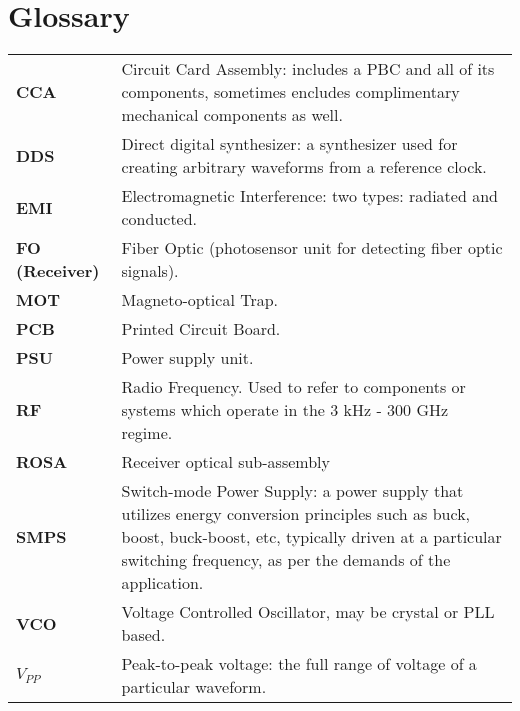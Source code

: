 \newpage
\section*{Glossary}

\begin{tabularx}{\linewidth}{lX}
  {\bf CCA} & Circuit Card Assembly: includes a PBC and all of its components,
  sometimes encludes complimentary mechanical components as well. \\
  {\bf DDS} & Direct digital synthesizer: a synthesizer used for creating
  arbitrary waveforms from a reference clock. \\
  {\bf EMI} & Electromagnetic Interference: two types: radiated and conducted.\\
  {\bf FO (Receiver)} & Fiber Optic (photosensor unit for detecting fiber optic
  signals).  \\
  {\bf MOT} & Magneto-optical Trap. \\
  {\bf PCB} & Printed Circuit Board. \\
  {\bf PSU} & Power supply unit. \\
  {\bf RF} & Radio Frequency. Used to refer to components or systems which
  operate in the 3 kHz - 300 GHz regime. \\
  {\bf ROSA} & Receiver optical sub-assembly \\
  {\bf SMPS} & Switch-mode Power Supply: a power supply that utilizes
  energy conversion principles such as buck, boost, buck-boost, etc, typically
  driven at a particular switching frequency, as per the demands of the
  application. \\
  {\bf VCO} & Voltage Controlled Oscillator, may be crystal or PLL based. \\
  {\bf $V_{PP}$} & Peak-to-peak voltage: the full range of voltage of a
  particular waveform.
\end{tabularx}
